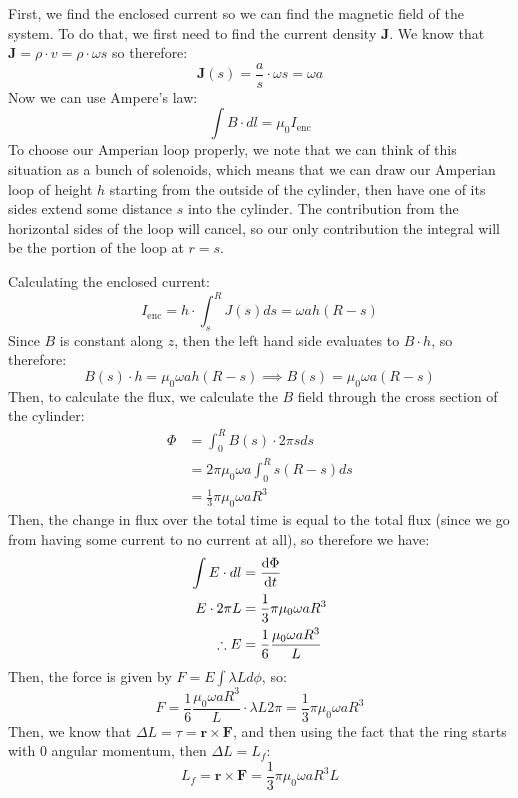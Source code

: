 \documentclass[10pt]{article}
\begin{document}
	\begin{solution}
		First, we find the enclosed current so we can find the magnetic field of the system. To do that, we 
		first need to find the current density $\mathbf J$. We know that $\mathbf J = \rho \cdot v 
		= \rho \cdot \omega s$
		so therefore: 
		\[
		\mathbf J(s) = \frac{a}{s} \cdot \omega s = \omega a
		\] 
		Now we can use Ampere's law:
		\[
			\int B \cdot dl = \mu_0 I_{\text{enc}}	
		\] 
		To choose our Amperian loop properly, we note that we can think of this situation as a bunch of 
		solenoids, which means that we can draw our Amperian loop of height $h$ starting from the outside of the cylinder,
		then have one of its sides extend some distance $s$ into the cylinder. The contribution from the 
		horizontal sides of the loop will cancel, so our only contribution the integral will be the portion 
		of the loop at $r = s$.

		Calculating the enclosed current:
		\[
			I_{\text{enc}} = h \cdot \int_s^R J(s) ds = \omega ah (R - s)
		\] 
		Since $B$ is constant along $z$, then the left hand side evaluates to $B \cdot h$, so therefore:
		\[
		B(s) \cdot h = \mu_0\omega a h (R - s) \implies B(s) = \mu_0 \omega a (R - s)
		\] 
		Then, to calculate the flux, we calculate the $B$ field through the cross section of the cylinder:
		\begin{align*}
			\Phi &= \int_0^R B(s) \cdot 2 \pi s ds\\
			&= 2 \pi \mu_0 \omega a \int_0^R s(R -s) ds \\
			&= \frac{1}{3}\pi \mu_0 \omega a R^3 
		\end{align*}
		Then, the change in flux over the total time is equal to the total flux (since we go from having 
		some current to no current at all), so therefore we have:
		\begin{align*}
			\int E \cdot dl &= \dv{\Phi}{t}\\
			E \cdot 2 \pi L &= \frac{1}{3}\pi \mu_0 \omega a R^3\\
			\therefore E &= \frac{1}{6}\frac{\mu_0\omega a R^3}{L}
		\end{align*}
		Then, the force is given by $F = E \int \lambda L d\phi$, so: 
		\[
		F = \frac{1}{6}\frac{\mu_0 \omega a R^3}{L} \cdot \lambda L 2 \pi = \frac{1}{3}\pi \mu_0 \omega a R^3
		\] 
		Then, we know that $\Delta L = \tau = \mathbf r \times \mathbf F$, and then using the fact that the ring starts with
		0 angular momentum, then $\Delta L = L_f$:
		\[
		L_f = \mathbf r \times \mathbf F = \frac{1}{3}\pi \mu_0 \omega a R^3 L
		\] 
	\end{solution}
	\pagebreak
\end{document}
